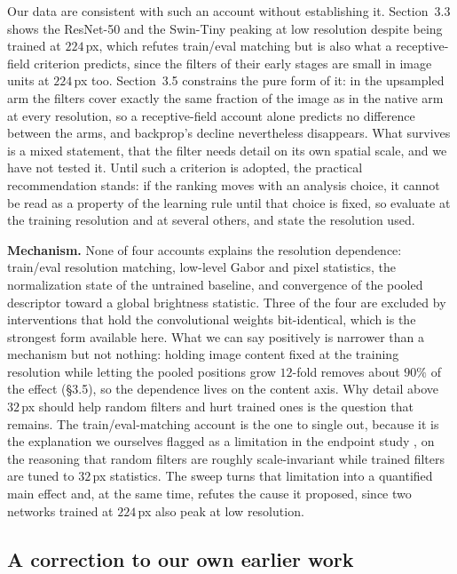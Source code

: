\documentclass[10pt,twocolumn]{article}
\begin{document}
Our data are consistent with such an account without establishing it. Section~3.3 shows the ResNet-50 and the Swin-Tiny peaking at low resolution despite being trained at $224$\,px, which refutes train/eval matching but is also what a receptive-field criterion predicts, since the filters of their early stages are small in image units at $224$\,px too. Section~3.5 constrains the pure form of it: in the upsampled arm the filters cover exactly the same fraction of the image as in the native arm at every resolution, so a receptive-field account alone predicts no difference between the arms, and backprop's decline nevertheless disappears. What survives is a mixed statement, that the filter needs detail on its own spatial scale, and we have not tested it. Until such a criterion is adopted, the practical recommendation stands: if the ranking moves with an analysis choice, it cannot be read as a property of the learning rule until that choice is fixed, so evaluate at the training resolution and at several others, and state the resolution used.

\textbf{Mechanism.} None of four accounts explains the resolution dependence: train/eval resolution matching, low-level Gabor and pixel statistics, the normalization state of the untrained baseline, and convergence of the pooled descriptor toward a global brightness statistic. Three of the four are excluded by interventions that hold the convolutional weights bit-identical, which is the strongest form available here. What we can say positively is narrower than a mechanism but not nothing: holding image content fixed at the training resolution while letting the pooled positions grow $12$-fold removes about $90\%$ of the effect (\S3.5), so the dependence lives on the content axis. Why detail above $32$\,px should help random filters and hurt trained ones is the question that remains. The train/eval-matching account is the one to single out, because it is the explanation we ourselves flagged as a limitation in the endpoint study \citep{leutenegger2026}, on the reasoning that random filters are roughly scale-invariant while trained filters are tuned to $32$\,px statistics. The sweep turns that limitation into a quantified main effect and, at the same time, refutes the cause it proposed, since two networks trained at $224$\,px also peak at low resolution.

\subsection{A correction to our own earlier work}
\end{document}
